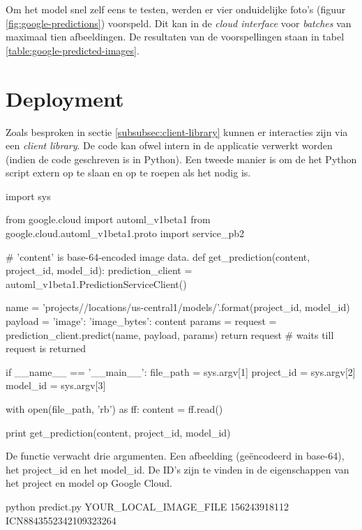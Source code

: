 Om het model snel zelf eens te testen, werden er vier onduidelijke foto's (figuur \ref{fig:google-predictions}) voorspeld. Dit kan in de \textit{cloud interface} voor \textit{batches} van maximaal tien afbeeldingen. De resultaten van de voorspellingen staan in tabel \ref{table:google-predicted-images}.

\section{Deployment}
\label{sec:google-automl-deployment}

Zoals besproken in sectie \ref{subsubsec:client-library} kunnen er interacties zijn via een \textit{client library}. De code kan ofwel intern in de applicatie verwerkt worden (indien de code geschreven is in Python). Een tweede manier is om de het Python script extern op te slaan en op te roepen als het nodig is.

\bigskip

\begin{python}
import sys

from google.cloud import automl_v1beta1
from google.cloud.automl_v1beta1.proto import service_pb2


# 'content' is base-64-encoded image data.
def get_prediction(content, project_id, model_id):
    prediction_client = automl_v1beta1.PredictionServiceClient()
    
    name = 'projects/{}/locations/us-central1/models/{}'.format(project_id, model_id)
    payload = {'image': {'image_bytes': content }}
    params = {}
    request = prediction_client.predict(name, payload, params)
    return request  # waits till request is returned

if __name__ == '__main__':
    file_path = sys.argv[1]
    project_id = sys.argv[2]
    model_id = sys.argv[3]

    with open(file_path, 'rb') as ff:
        content = ff.read()
    
    print get_prediction(content, project_id, model_id)
\end{python}

De functie verwacht drie argumenten. Een afbeelding (geëncodeerd in base-64), het project\_id en het model\_id. De ID's zijn te vinden in de eigenschappen van het project en model op Google Cloud.

\bigskip

\begin{python}
python predict.py YOUR_LOCAL_IMAGE_FILE 156243918112 ICN8843552342109323264
\end{python}

